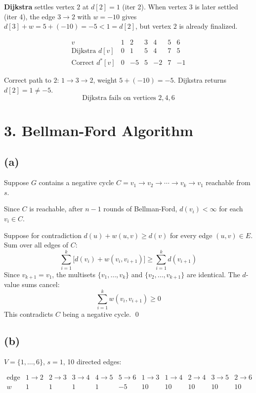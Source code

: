 \documentclass[11pt]{article}
\begin{document}
\textbf{Dijkstra} settles vertex $2$ at $d[2] = 1$ (iter 2). When vertex $3$ is later settled (iter 4), the edge $3 \to 2$ with $w = -10$ gives $d[3] + w = 5 + (-10) = -5 < 1 = d[2]$, but vertex $2$ is already finalized.

\[
\begin{array}{c|cccccc}
v & 1 & 2 & 3 & 4 & 5 & 6 \\ \hline
\text{Dijkstra } d[v] & 0 & 1 & 5 & 4 & 7 & 5 \\
\text{Correct } d^*[v] & 0 & -5 & 5 & -2 & 7 & -1
\end{array}
\]

Correct path to $2$: $1 \to 3 \to 2$, weight $5 + (-10) = -5$. Dijkstra returns $d[2] = 1 \ne -5$.
\[\boxed{\text{Dijkstra fails on vertices } 2, 4, 6}\]

\newpage
\section*{3. Bellman-Ford Algorithm}

\vspace{-10pt}
\subsection*{(a)}

Suppose $G$ contains a negative cycle $C = v_1 \to v_2 \to \cdots \to v_k \to v_1$ reachable from $s$.

Since $C$ is reachable, after $n - 1$ rounds of Bellman-Ford, $d(v_i) < \infty$ for each $v_i \in C$.

Suppose for contradiction $d(u) + w(u,v) \ge d(v)$ for every edge $(u,v) \in E$. Sum over all edges of $C$:
\[
\sum_{i=1}^{k} \bigl[d(v_i) + w(v_i, v_{i+1})\bigr] \ge \sum_{i=1}^{k} d(v_{i+1})
\]
Since $v_{k+1} = v_1$, the multisets $\{v_1, \ldots, v_k\}$ and $\{v_2, \ldots, v_{k+1}\}$ are identical. The $d$-value sums cancel:
\[
\sum_{i=1}^{k} w(v_i, v_{i+1}) \ge 0
\]
This contradicts $C$ being a negative cycle. \qed

\vspace{-20pt}
\subsection*{(b)}

$V = \{1, \ldots, 6\}$, $s = 1$, 10 directed edges:

\[
\begin{array}{c|cccccccccc}
\text{edge} & 1{\to}2 & 2{\to}3 & 3{\to}4 & 4{\to}5 & 5{\to}6 & 1{\to}3 & 1{\to}4 & 2{\to}4 & 3{\to}5 & 2{\to}6 \\ \hline
w & 1 & 1 & 1 & 1 & -5 & 10 & 10 & 10 & 10 & 10
\end{array}
\]
\end{document}
